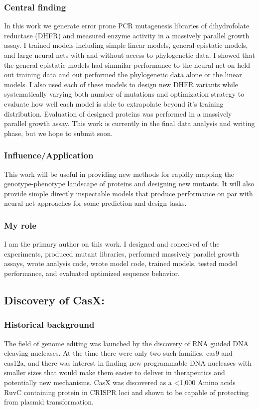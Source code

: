 \documentclass{article}
\begin{document}
\subsubsection{Central finding}
In this work we generate error prone PCR mutagenesis libraries of dihydrofolate reductase (DHFR) and measured enzyme activity in a massively parallel growth assay. 
I trained models including simple linear models, general epistatic models, and large neural nets with and without access to phylogenetic data. 
I showed that the general epistatic models had simmilar performance to the neural net on held out training data and out performed the phylogenetic data alone or the linear models. 
I also used each of these models to design new DHFR variants while systematically varying both number of mutations and optimization strategy to evaluate how well each model is able to extrapolate beyond it's training distribution.
Evaluation of designed proteins was performed in a massively parallel growth assay.
This work is currently in the final data analysis and writing phase, but we hope to submit soon.
%
\subsubsection{Influence/Application}
This work will be useful in providing new methods for rapidly mapping the genotype-phenotype landscape of proteins and designing new mutants.
It will also provide simple directly inspectable models that produce performance on par with neural net approaches for some prediction and design tasks.
%
\subsubsection{My role}
I am the primary author on this work.
I designed and conceived of the experiments, produced mutant libraries, performed massively parallel growth assays, wrote analysis code, wrote model code, trained models, tested model performance, and evaluated optimized sequence behavior.
%

\leavevmode\newline

\newrefsection
\subsection{Discovery of CasX:}
\subsubsection{Historical background}
The field of genome editing was launched by the discovery of RNA guided DNA cleaving nucleases.
At the time there were only two such families, cas9 and cas12a, and there was interest in finding new programmable DNA nucleases with smaller sizes that would make them easier to deliver in therapeutics and potentially new mechanisms.
CasX was discovered as a <1,000 Amino acids RuvC containing protein in CRISPR loci and shown to be capable of protecting from plasmid transformation.
%
\end{document}
